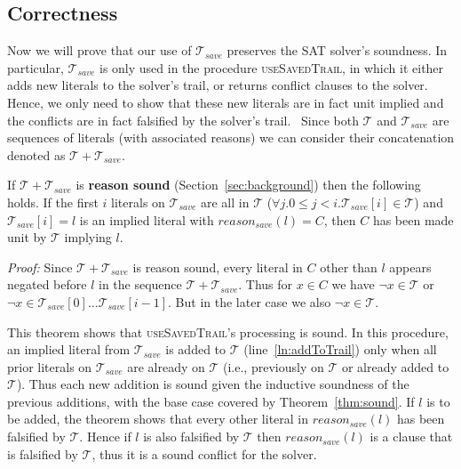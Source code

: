 \documentclass[runningheads]{llncs}
\newcommand{\sat}{SAT\xspace}
\newcommand{\trail}{\ensuremath{\mathcal{T}}}
\newcommand{\reasonsave}[1]{\ensuremath{\mathit{reason_{\mathit{save}}(#1)}}}
\newcommand{\trailsave}{\trail_{\mathit{save}}}
\newcommand{\ust}{\textsc{useSavedTrail}\xspace}
\newcommand{\whitebox}{\raisebox{.5ex}{\fbox{\hspace*{.2ex}}}}
\begin{document}
\subsection{Correctness}
Now we will prove that our use of $\trailsave$ preserves the \sat
solver's soundness. In particular, $\trailsave$ is only used in the
procedure \ust, in which it either adds new literals
to the solver's trail, or returns conflict clauses to the solver.
Hence, we only need to show that these new literals are in fact unit
implied and the conflicts are in fact falsified by the solver's trail.
\
Since both $\trail$ and $\trailsave$ are sequences of literals (with
associated reasons) we can consider their concatenation denoted as
$\trail + \trailsave$.
\begin{theorem}
    \label{thm:sound}
    If $\trail + \trailsave$ is \textbf{reason sound}
    (Section~\ref{sec:background}) then the following holds.  If the
    first $i$ literals on $\trailsave$ are all in $\trail$
    ($\forall j. 0\leq j< i. \trailsave[i]\in \trail$) and
    $\trailsave[i]=l$ is an implied literal with $\reasonsave{l} = C$,
    then $C$ has been made unit by $\trail$ implying $l$.
\end{theorem}
\noindent\emph{Proof:}
Since $\trail + \trailsave$ is reason sound, every literal in $C$
other than $l$ appears negated before $l$ in the sequence
$\trail + \trailsave$. Thus for $x\in C$ we have $\lnot x \in \trail$
or $\lnot x \in \trailsave[0]\ldots\trailsave[i-1]$. But in the later
case we also $\lnot x \in \trail$. 
\whitebox

This theorem shows that \ust's processing is
sound. In this procedure, an implied literal from $\trailsave$ is added
to $\trail$ (line~\ref{ln:addToTrail}) only when all prior literals on
$\trailsave$ are already on $\trail$ (i.e., previously on $\trail$ or
already added to $\trail$). Thus each new addition is sound given the
inductive soundness of the previous additions, with the base case
covered by Theorem~\ref{thm:sound}. If $l$ is to be added, the theorem
shows that every other literal in $\reasonsave{l}$ has been falsified
by $\trail$. Hence if $l$ is also falsified by $\trail$ then
$\reasonsave{l}$ is a clause that is falsified by $\trail$, thus it is
a sound conflict for the solver.
\end{document}
